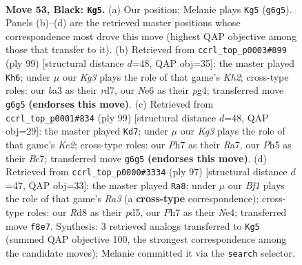 \documentclass[11pt]{article}
\begin{document}
\clearpage

\begin{figure}[p]\centering
\begin{subfigure}{0.46\textwidth}\centering
\resizebox{\linewidth}{!}{%
\newchessgame
\chessboard[
  setfen={3r1b2/7p/p2pn1k1/P3p2p/2P1P2R/BP3P2/3K2B1/8 b - - 3 53},
  showmover=false,
  pgfstyle=straightmove, color=movearrow, markmove={g6-g5}
]}
\caption{}
\end{subfigure}\hfill
\begin{subfigure}{0.46\textwidth}\centering
\resizebox{\linewidth}{!}{%
\newchessgame
\chessboard[
  setfen={8/3R2pk/5p2/1pr5/p1b2PPp/P1B1K2P/1P6/8 b - - 7 50},
  showmover=false,
  pgfstyle=straightmove, color=movearrow, markmove={h7-h6}
]}
\caption{}
\end{subfigure}
\\[4pt]
\begin{subfigure}{0.46\textwidth}\centering
\resizebox{\linewidth}{!}{%
\newchessgame
\chessboard[
  setfen={2R5/r1b1k1p1/5n1p/3pp3/1P3p1P/1B3P2/1BP1KP2/8 b - - 17 50},
  showmover=false,
  pgfstyle=straightmove, color=movearrow, markmove={e7-d7}
]}
\caption{}
\end{subfigure}\hfill
\begin{subfigure}{0.46\textwidth}\centering
\resizebox{\linewidth}{!}{%
\newchessgame
\chessboard[
  setfen={8/8/r2p1k2/p1pP1p2/2P1nB1p/1P5P/4K1P1/R7 b - - 3 49},
  showmover=false,
  pgfstyle=straightmove, color=movearrow, markmove={a6-a8}
]}
\caption{}
\end{subfigure}
\caption{\textbf{Move 53, Black: \texttt{Kg5}.} (a) Our position; Melanie plays \texttt{Kg5} (\texttt{g6g5}). Panels (b)--(d) are the retrieved master positions whose correspondence most drove this move (highest QAP objective among those that transfer to it). (b) Retrieved from \texttt{ccrl\_top\_p0003\#899} (ply 99) [structural distance $d$=48, QAP obj=35]: the master played \texttt{Kh6}; under $\mu$ our \emph{Kg3} plays the role of that game's \emph{Kh2}; cross-type roles: our \emph{b}a3 as their \emph{r}d7, our \emph{N}e6 as their \emph{p}g4; transferred move \texttt{g6g5} \textbf{(endorses this move)}. (c) Retrieved from \texttt{ccrl\_top\_p0001\#834} (ply 99) [structural distance $d$=48, QAP obj=29]: the master played \texttt{Kd7}; under $\mu$ our \emph{Kg3} plays the role of that game's \emph{Ke2}; cross-type roles: our \emph{P}h7 as their \emph{R}a7, our \emph{P}h5 as their \emph{B}c7; transferred move \texttt{g6g5} \textbf{(endorses this move)}. (d) Retrieved from \texttt{ccrl\_top\_p0000\#3334} (ply 97) [structural distance $d$=47, QAP obj=33]: the master played \texttt{Ra8}; under $\mu$ our \emph{Bf1} plays the role of that game's \emph{Ra3} (a \textbf{cross-type} correspondence); cross-type roles: our \emph{R}d8 as their \emph{p}d5, our \emph{P}h7 as their \emph{N}e4; transferred move \texttt{f8e7}. Synthesis: 3 retrieved analogs transferred to \texttt{Kg5} (summed QAP objective 100, the strongest correspondence among the candidate moves); Melanie committed it via the \texttt{search} selector.}
\label{fig:thought-m105}
\end{figure}
\end{document}
